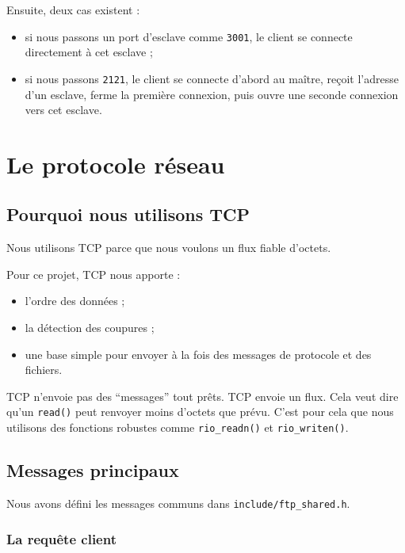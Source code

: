 \documentclass[a4paper,11pt]{article}
\begin{document}
Ensuite, deux cas existent :

\begin{itemize}[leftmargin=*]
    \item si nous passons un port d'esclave comme \texttt{3001}, le client se connecte directement à cet esclave ;
    \item si nous passons \texttt{2121}, le client se connecte d'abord au maître, reçoit l'adresse d'un esclave, ferme la première connexion, puis ouvre une seconde connexion vers cet esclave.
\end{itemize}
\newpage
\section{Le protocole réseau}

\subsection{Pourquoi nous utilisons TCP}

Nous utilisons TCP parce que nous voulons un flux fiable d'octets.

Pour ce projet, TCP nous apporte :

\begin{itemize}[leftmargin=*]
    \item l'ordre des données ;
    \item la détection des coupures ;
    \item une base simple pour envoyer à la fois des messages de protocole et des fichiers.
\end{itemize}

\begin{tipbox}
TCP n'envoie pas des ``messages'' tout prêts. TCP envoie un flux. Cela veut
dire qu'un \texttt{read()} peut renvoyer moins d'octets que prévu. C'est pour
cela que nous utilisons des fonctions robustes comme \texttt{rio\_readn()} et
\texttt{rio\_writen()}.
\end{tipbox}

\subsection{Messages principaux}

Nous avons défini les messages communs dans \texttt{include/ftp\_shared.h}.

\subsubsection{La requête client}
\end{document}

